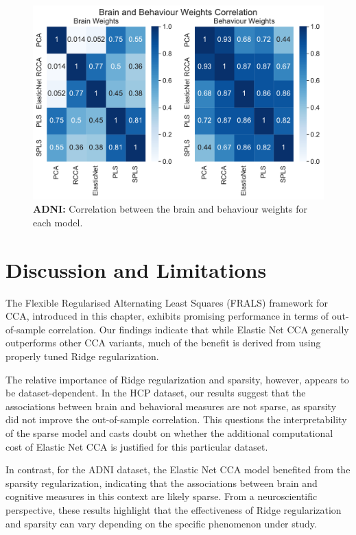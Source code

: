 \begin{figure}
    \centering
    \includegraphics[width=0.8\linewidth]{figures/adni/brain and behaviour weights correlation}
    \caption{\textbf{ADNI:} Correlation between the brain and behaviour \gls{weights} for each model.}\label{fig:brain-behaviour-weights-sim-adni}
\end{figure}

\section{Discussion and Limitations}

The Flexible Regularised Alternating Least Squares (FRALS) framework for CCA, introduced in this chapter, exhibits promising performance in terms of out-of-sample correlation. Our findings indicate that while Elastic Net CCA generally outperforms other CCA variants, much of the benefit is derived from using properly tuned Ridge regularization. 

The relative importance of Ridge regularization and sparsity, however, appears to be dataset-dependent. In the HCP dataset, our results suggest that the associations between brain and behavioral measures are not sparse, as sparsity did not improve the out-of-sample correlation. This questions the interpretability of the sparse model and casts doubt on whether the additional computational cost of Elastic Net CCA is justified for this particular dataset.

In contrast, for the ADNI dataset, the Elastic Net CCA model benefited from the sparsity regularization, indicating that the associations between brain and cognitive measures in this context are likely sparse. From a neuroscientific perspective, these results highlight that the effectiveness of Ridge regularization and sparsity can vary depending on the specific phenomenon under study.


